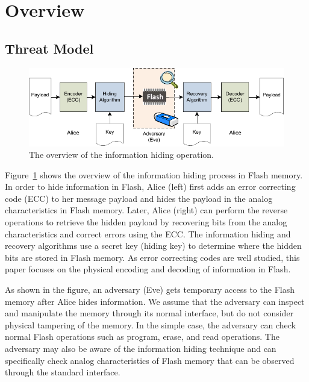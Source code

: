 \section{Overview}
\label{sec:overview}

\subsection{Threat Model}

\begin{figure} 
\begin{center} 
\includegraphics[width=6.5in]{figs/overview.pdf} 
\caption{The overview of the information hiding operation.}
\label{fig:overview} 
\end{center} 
\end{figure} 

Figure~\ref{fig:overview} shows the overview of the information hiding
process in Flash memory. In order to hide information in Flash, Alice (left)
first adds an error correcting code (ECC) to her message payload and hides the
payload in the analog characteristics in Flash memory. Later, Alice (right) can
perform the reverse operations to retrieve the hidden payload by recovering
bits from the analog characteristics and correct errors using the ECC.
The information hiding and recovery algorithms use a secret key (hiding key)
to determine where the hidden bits are stored in Flash memory. 
As error correcting codes are well studied, this paper focuses on the
physical encoding and decoding of information in Flash.


As shown in the figure, an adversary (Eve) gets temporary access
to the Flash memory after Alice hides information. We assume that the adversary can inspect
and manipulate the memory through its normal interface, but do not consider physical
tampering of the memory. In the simple case, the adversary can check normal Flash operations
such as program, erase, and read operations. The adversary may also be aware of the information
hiding technique and can specifically check analog characteristics of Flash memory that
can be observed through the standard interface. 

